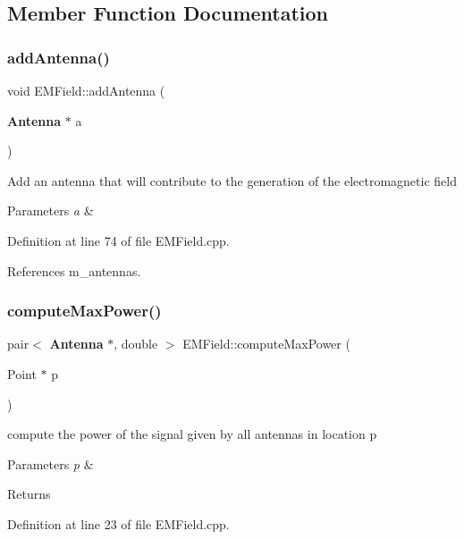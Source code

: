 \subsection{Member Function Documentation}
\mbox{\label{class_e_m_field_ac531ecbce4c81aa5da19fe3c734a585c}} 
\subsubsection{addAntenna()}
{\footnotesize\ttfamily void E\+M\+Field\+::add\+Antenna (\begin{DoxyParamCaption}\item[{\textbf{ Antenna} $\ast$}]{a }\end{DoxyParamCaption})}

Add an antenna that will contribute to the generation of the electromagnetic field 
\begin{DoxyParams}{Parameters}
{\em a} & \\
\hline
\end{DoxyParams}


Definition at line 74 of file E\+M\+Field.\+cpp.



References m\+\_\+antennas.

\mbox{\label{class_e_m_field_adeed63c6ce6d5cf922a884abf731e601}} 
\subsubsection{computeMaxPower()}
{\footnotesize\ttfamily pair$<$ \textbf{ Antenna} $\ast$, double $>$ E\+M\+Field\+::compute\+Max\+Power (\begin{DoxyParamCaption}\item[{Point $\ast$}]{p }\end{DoxyParamCaption})}

compute the power of the signal given by all antennas in location p 
\begin{DoxyParams}{Parameters}
{\em p} & \\
\hline
\end{DoxyParams}
\begin{DoxyReturn}{Returns}

\end{DoxyReturn}


Definition at line 23 of file E\+M\+Field.\+cpp.



